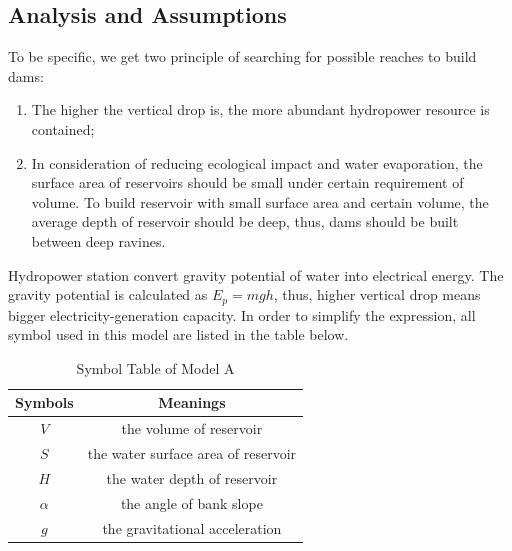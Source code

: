 \documentclass{mcmthesis}
\begin{document}
\subsection{Analysis and Assumptions}
\indent \indent To be specific, we get two principle of searching for possible reaches to build dams:
\begin{enumerate}
  \setlength{\itemsep}{0pt}
  \setlength{\parsep}{0pt}
  \setlength{\parskip}{0pt}
  \item The higher the vertical drop is, the more abundant hydropower resource is contained;
  \item In consideration of reducing ecological impact and water evaporation, the surface area of reservoirs should be small under certain requirement of volume. To build reservoir with small surface area and certain volume, the average depth of reservoir should be deep, thus, dams should be built between deep ravines.
\end{enumerate}

\indent Hydropower station convert gravity potential of water into electrical energy. The gravity potential is calculated as $E_{p} = mgh$, thus, higher vertical drop means bigger electricity-generation capacity. In order to simplify the expression, all symbol used in this model are listed in the table below.\\

\begin{table}[!ht]
\centering
  \begin{tabular}{cc}
  \hline
  Symbols & Meanings \\
  \hline
  $V$ & the volume of reservoir \\
  $S$ & the water surface area of reservoir \\
  $H$ & the water depth of reservoir \\
  $\alpha$ & the angle of bank slope \\
  $g$ & the gravitational acceleration \\
  \hline
  \end{tabular}
\caption{Symbol Table of Model A}
\end{table}
\end{document}
